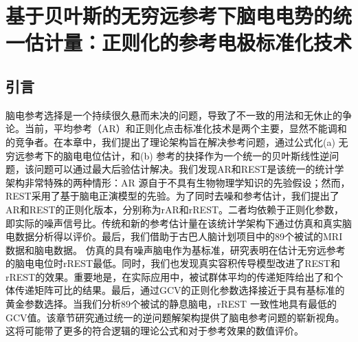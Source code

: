 \chapter{基于贝叶斯的无穷远参考下脑电电势的统一估计量：正则化的参考电极标准化技术}
\section{引言}
脑电参考选择是一个持续很久悬而未决的问题，导致了不一致的用法和无休止的争论。当前，平均参考（AR）和正则化点击标准化技术是两个主要，显然不能调和的竞争者。在本章中，我们提出了理论架构旨在解决参考问题，通过公式化(a) 无穷远参考下的脑电电位估计，和(b) 参考的抉择作为一个统一的贝叶斯线性逆问题，该问题可以通过最大后验估计解决。我们发现AR和REST是该统一的统计学架构非常特殊的两种情形：AR 源自于不具有生物物理学知识的先验假设；然而，REST采用了基于脑电正演模型的先验。为了同时去噪和参考估计，我们提出了AR和REST的正则化版本，分别称为rAR和rREST。二者均依赖于正则化参数，即实际的噪声信号比。传统和新的参考估计量在该统计学架构下通过仿真和真实脑电数据分析得以评价。最后，我们借助于古巴人脑计划项目中的89个被试的MRI数据和脑电数据。 仿真的具有噪声脑电作为基标准，研究表明在估计无穷远参考的脑电电位时rREST最低。同时，我们也发现真实容积传导模型改进了REST和rREST的效果。重要地是，在实际应用中，被试群体平均的传递矩阵给出了和个体传递矩阵可比的结果。最后，通过GCV的正则化参数选择接近于具有基标准的黄金参数选择。当我们分析89个被试的静息脑电，rREST 一致性地具有最低的GCV值。该章节研究通过统一的逆问题解架构提供了脑电参考问题的崭新视角。 这将可能带了更多的符合逻辑的理论公式和对于参考效果的数值评价。
